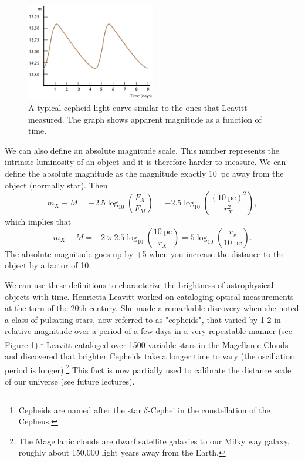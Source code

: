 \documentclass[a4paper,12pt]{article}
\theoremstyle{remark}
\newcommand{\mrm}[1]{\mathrm{#1}}
\renewcommand{\=}[1]{\stackrel{#1}{=}} %
\theoremstyle{plain}
\theoremstyle{definition}
\begin{document}
\begin{figure}[t]
\begin{center}
    \includegraphics*[angle=0,width=0.5\textwidth]{img/cepheids.png}
    \caption[Insert text]{A typical cepheid light curve similar to the ones that Leavitt measured. The graph shows apparent magnitude as a function of time.}
\label{fig:cepheids}
\end{center}
\end{figure}

We can also define an absolute magnitude scale. This number represents the intrinsic luminosity of an object and it is therefore harder to measure. We can define the absolute magnitude as the magnitude exactly 10~pc away from the object (normally star).  Then
\begin{equation}
m_X - M = -2.5 \log _{10} \left( \frac{F_X}{F_M} \right) = -2.5 \log _{10} \left( \frac{(10 \:\mrm{pc})^{2}}{r^{2}_X} \right),
\end{equation}
which implies that
\begin{equation}
m_X - M = -2 \times 2.5 \log_{10} \left( \frac{10 \:\mrm{pc}}{r_X} \right) = 5 \log _{10} \left( \frac{r_x}{10 \: \mrm{pc}} \right).
\end{equation}
The absolute magnitude goes up by +5 when you increase the distance to the object by a factor of 10.

We can use these definitions to characterize the brightness of astrophysical objects with time. Henrietta Leavitt worked on cataloging optical measurements at the turn of the 20th century. She made a remarkable discovery when she noted a class of pulsating stars, now referred to as "cepheids", that varied by 1-2 in relative magnitude over a period of a few days in a very repeatable manner (see Figure \ref{fig:cepheids}).\footnote{Cepheids are named after the star $\delta$-Cephei in the constellation of the Cepheus.} Leavitt cataloged over 1500 variable stars in the Magellanic Clouds and discovered that brighter Cepheids take a longer time to vary (the oscillation period is longer).\footnote{The Magellanic clouds are dwarf satellite galaxies to our Milky way galaxy, roughly about 150,000 light years away from the Earth.} This fact is now partially used to calibrate the distance scale of our universe (see future lectures). %
\end{document}
